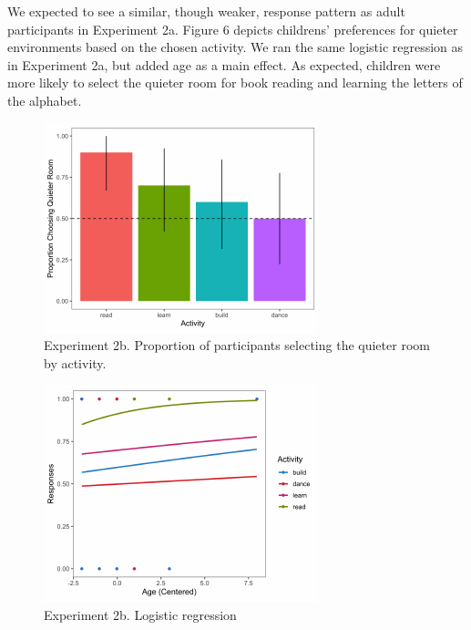 \documentclass[10pt, letterpaper]{article}
\newenvironment{CodeChunk}{}{}
\begin{document}
We expected to see a similar, though weaker, response pattern as adult
participants in Experiment 2a. Figure 6 depicts childrens' preferences
for quieter environments based on the chosen activity. We ran the same
logistic regression as in Experiment 2a, but added age as a main effect.
As expected, children were more likely to select the quieter room for
book reading and learning the letters of the alphabet.

\begin{CodeChunk}
\begin{figure}[H]

{\centering \includegraphics{figs/image 6-1} 

}

\caption[Experiment 2b]{Experiment 2b. Proportion of participants selecting the quieter room by activity.}\label{fig:image 6}
\end{figure}
\end{CodeChunk}

\begin{CodeChunk}
\begin{figure}[H]

{\centering \includegraphics{figs/image 7-1} 

}

\caption[Experiment 2b]{Experiment 2b. Logistic regression}\label{fig:image 7}
\end{figure}
\end{CodeChunk}
\end{document}
